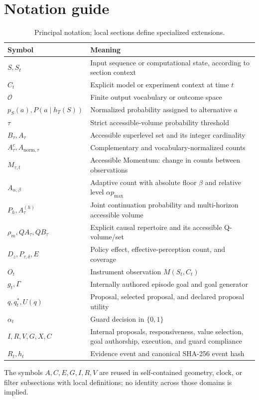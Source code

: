 \section{Notation guide}
\label{app:notation}
\begin{table}[htbp]
\centering
\caption{Principal notation; local sections define specialized extensions.}
\label{tab:notation}
{\small
\begin{tabularx}{\textwidth}{p{3.0cm}X}
\toprule
Symbol&Meaning\\
\midrule
$S,S_t$&Input sequence or computational state, according to section context\\
$C_t$&Explicit model or experiment context at time $t$\\
$\mathcal O$&Finite output vocabulary or outcome space\\
$p_S(a),P(a\mid h_T(S))$&Normalized probability assigned to alternative $a$\\
$\tau$&Strict accessible-volume probability threshold\\
$B_\tau,A_\tau$&Accessible superlevel set and its integer cardinality\\
$A_\tau^c,A_{\mathrm{norm},\tau}$&Complementary and vocabulary-normalized counts\\
$M_{\tau,t}$&Accessible Momentum: change in counts between observations\\
$A_{\alpha,\beta}$&Adaptive count with absolute floor $\beta$ and relative level $\alpha p_{\max}$\\
$P_h,A_\tau^{(h)}$&Joint continuation probability and multi-horizon accessible volume\\
$\rho_m,QA_\tau,QB_\tau$&Explicit causal repertoire and its accessible Q-volume/set\\
$D_z,P_{\tau,\delta},E$&Policy effect, effective-perception count, and coverage\\
$O_t$&Instrument observation $M(S_t,C_t)$\\
$g_t,\Gamma$&Internally authored episode goal and goal generator\\
$q,q_t^*,U(q)$&Proposal, selected proposal, and declared proposal utility\\
$\alpha_t$&Guard decision in $\{0,1\}$\\
$I,R,V,G,X,C$&Internal proposals, responsiveness, value selection, goal authorship, execution, and guard compliance\\
$R_t,h_t$&Evidence event and canonical SHA-256 event hash\\
\bottomrule
\end{tabularx}}
\end{table}
The symbols $A,C,E,G,I,R,V$ are reused in self-contained geometry, clock, or filter subsections with local definitions; no identity across those domains is implied.

